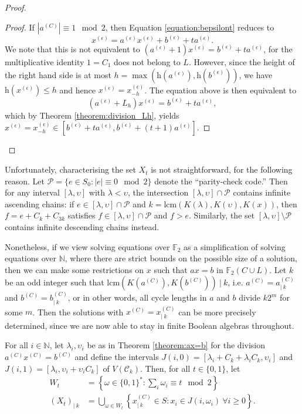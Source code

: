 \documentclass[a4paper, 11pt]{article}
\theoremstyle{plain}
\theoremstyle{definition}
\newcommand{\N} {\mathbb{N}}
\newcommand{\F} {\mathbb{F}}
\newcommand{\lcm}       {\mathrm{lcm}}
\newcommand{\Height}    {\mathrm{h}}
\begin{document}
\begin{proof}
\begin{proof}
If $|a^{(C)}| \equiv 1 \mod 2$, then Equation \eqref{equation:bepsilont} reduces to
\[
    x^{(\epsilon)} = a^{(\epsilon)} x^{(\epsilon)} + b^{(\epsilon)} + t a^{(\epsilon)}.
\]
We note that this is not equivalent to $(a^{(\epsilon)} + 1)  x^{(\epsilon)} = b^{(\epsilon)} + t a^{(\epsilon)}$, for the multiplicative identity $1 = C_1$ does not belong to $L$. However, since the height of the right hand side is at most $h = \max ( \Height( a^{(\epsilon)} ), \Height( b^{(\epsilon)} ) )$, we have $\Height( x^{(\epsilon)} ) \le h$ and hence $x^{(\epsilon)} = x^{(\epsilon)}_{ -h }$.
The equation above is then equivalent to
\[
    ( a^{(\epsilon)} + L_h) x^{(\epsilon)} = b^{(\epsilon)} + t a^{(\epsilon)},
\]
which by Theorem \ref{theorem:division_Lh}, yields $x^{(\epsilon)} = x^{(\epsilon)}_{ -h } \in [ b^{(\epsilon)} + t a^{(\epsilon)}, b^{(\epsilon)} + (t + 1) a^{(\epsilon)} ]$.
\end{proof}

\end{proof}


Unfortunately, characterising the set $X_t$ is not straightforward, for the following reason. Let $\mathcal{P} = \{ e \in S_0 : |e| \equiv 0 \mod 2 \}$ denote the ``parity-check code.'' Then for any interval $[\lambda, \upsilon]$ with $\lambda < \upsilon$, the intersection $[\lambda, \upsilon] \cap \mathcal{P}$ contains infinite ascending chains: if $e \in [\lambda, \upsilon] \cap \mathcal{P}$ and $k = \lcm( K( \lambda ), K( \upsilon ), K( x ) )$, then $f = e + C_k + C_{3k}$ satisfies $f \in [\lambda, \upsilon] \cap \mathcal{P}$ and $f > e$. Similarly, the set $[\lambda, \upsilon] \setminus \mathcal{P}$ contains infinite descending chains instead.

Nonetheless, if we view solving equations over $\F_2$ as a simplification of solving equations over $\N$, where there are strict bounds on the possible size of a solution, then we can make some restrictions on $x$ such that $ax = b$ in $\F_2(C \cup L)$. Let $k$ be an odd integer such that $\lcm( K(a^{(C)}), K(b^{(C)}) ) \ | \ k$, i.e. $a^{(C)} = a^{(C)}_{| \ k}$ and $b^{(C)} = b^{(C)}_{| \ k}$, or in other words, all cycle lengths in $a$ and $b$ divide $k2^m$ for some $m$. Then the solutions with $x^{(C)} = x^{(C)}_{| \ k}$ can be more precisely determined, since we are now able to stay in finite Boolean algebras throughout. 


For all $i \in \N$, let $\lambda_i, \upsilon_i$ be as in Theorem \ref{theorem:ax=b} for the division $a^{(C)} x^{(C)} = b^{(C)}$ and define the intervals $J(i,0) =[\lambda_i + C_k + \lambda_i C_k, \upsilon_i]$ and $J(i,1) = [ \lambda_i, \upsilon_i + \upsilon_i C_k ]$ of $V( \mathcal{C}_k )$. Then, for all $t \in \{0,1\}$, let
\begin{align*}
    W_t &= \left\{ \omega \in \{0,1\}^* : \sum_i \omega_i \equiv t \mod 2 \right\} \\
    (X_t)_{| \ k} &= \bigcup_{ \omega \in W_t } \left\{ x^{(C)}_{| \ k} \in S : x_i \in J(i,\omega_i) \ \forall i \ge 0 \right\}.
\end{align*}
\end{document}
